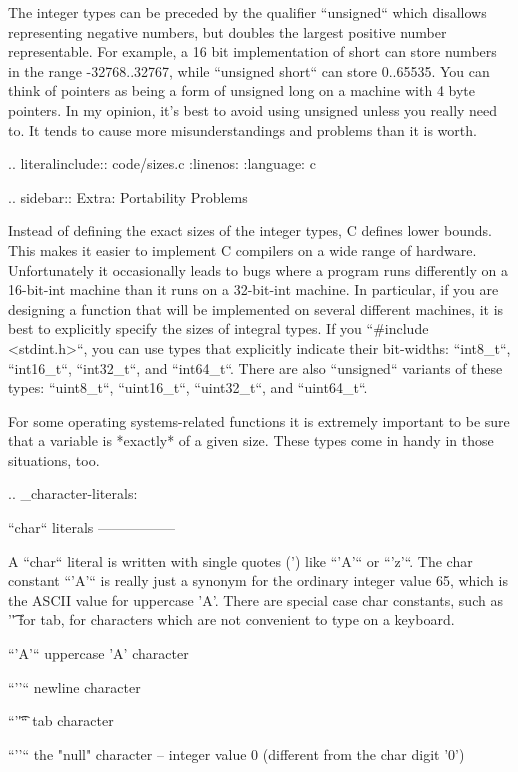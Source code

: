 The integer types can be preceded by the qualifier ``unsigned`` which disallows representing negative numbers, but doubles the largest positive number representable. For example, a 16 bit implementation of short can store numbers in the range -32768..32767, while ``unsigned short`` can store 0..65535. You can think of pointers as being a form of unsigned long on a machine with 4 byte pointers. In my opinion, it's best to avoid using unsigned unless you really need to. It tends to cause more misunderstandings and problems than it is worth.

.. literalinclude:: code/sizes.c
   :linenos:
   :language: c


.. sidebar:: Extra: Portability Problems

    Instead of defining the exact sizes of the integer types, C defines lower bounds. This makes it easier to implement C compilers on a wide range of hardware. Unfortunately it occasionally leads to bugs where a program runs differently on a 16-bit-int machine than it runs on a 32-bit-int machine. In particular, if you are designing a function that will be implemented on several different machines, it is best to explicitly specify the sizes of integral types.  If you ``#include <stdint.h>``, you can use types that explicitly indicate their bit-widths: ``int8_t``, ``int16_t``, ``int32_t``, and ``int64_t``.  There are also ``unsigned`` variants of these types: ``uint8_t``, ``uint16_t``, ``uint32_t``, and ``uint64_t``.   

    For some operating systems-related functions it is extremely important to be sure that a variable is *exactly* of a given size. These types come in handy in those situations, too.


.. _character-literals:


``char`` literals
-----------------

A ``char`` literal is written with single quotes (') like ``'A'`` or ``'z'``. The char constant ``'A'`` is really just a synonym for the ordinary integer value 65, which is the ASCII value for uppercase 'A'. There are special case char constants, such as '\t' for tab, for characters which are not convenient to type on a keyboard.

``'A'``
    uppercase 'A' character

``'\n'``
    newline character

``'\t'``
    tab character

``'\0'``
    the "null" character -- integer value 0 (different from the char digit '0')

